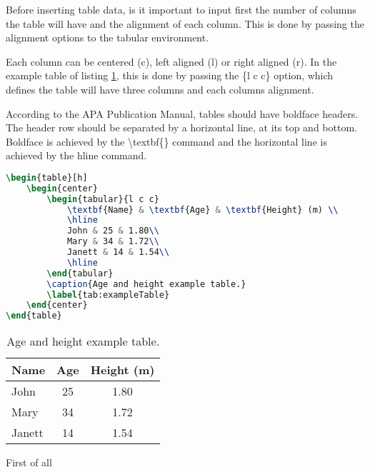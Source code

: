 	Before inserting table data, is it important to input first the number of columns the table will have and the alignment of each column. This is done by passing the alignment options to the {\ttfamily tabular} environment.

	Each column can be centered ({\ttfamily c}), left aligned ({\ttfamily l}) or right aligned ({\ttfamily r}). In the example table of listing \ref{tab:exampleTable}, this is done by passing the {\ttfamily \{l c c\}} option, which defines the table will have three columns and each columns alignment.

	According to the APA Publication Manual, tables should have boldface headers. The header row should be separated by a horizontal line, at its top and bottom. Boldface is achieved by the {\ttfamily \textbackslash textbf\{\}} command and the horizontal line is achieved by the {\ttfamily hline} command.

\begin{lstlisting}[caption = {Example table (table \ref{tab:exampleTable})}, label = {lst:exampleTable}, style = prettyListing, language = tex]
\begin{table}[h]
	\begin{center}
		\begin{tabular}{l c c}
			\textbf{Name} & \textbf{Age} & \textbf{Height} (m) \\
			\hline
			John & 25 & 1.80\\
			Mary & 34 & 1.72\\
			Janett & 14 & 1.54\\
			\hline
		\end{tabular}
		\caption{Age and height example table.}
		\label{tab:exampleTable}
	\end{center}
\end{table}
\end{lstlisting}

\begin{table}[h]
	\begin{center}
		\begin{tabular}{l c c}
			\hline
			\textbf{Name} & \textbf{Age} & \textbf{Height} (m) \\
			\hline
			John & 25 & 1.80\\
			Mary & 34 & 1.72\\
			Janett & 14 & 1.54\\
			\hline
		\end{tabular}
		\caption{Age and height example table.}
		\label{tab:exampleTable}
	\end{center}
\end{table}

	First of all
